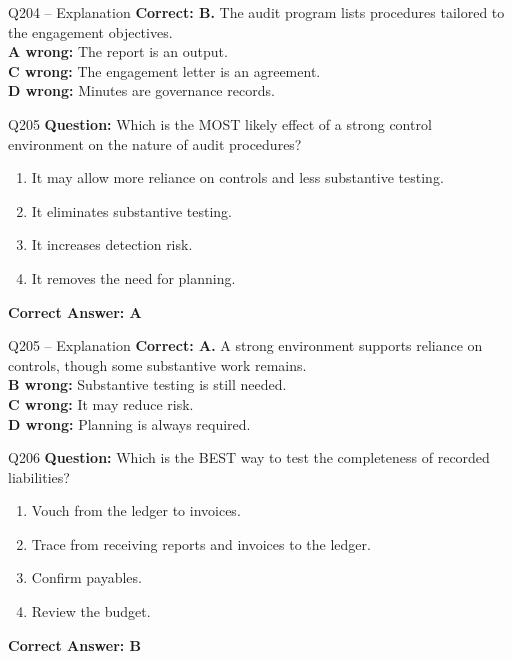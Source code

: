 \documentclass[aspectratio=169,10pt]{beamer}
\begin{document}
	\begin{frame}[t]{Q204 -- Explanation}
		\small
		\textbf{Correct: B.} The audit program lists procedures tailored to the engagement objectives. \\[4pt]
		\textbf{A wrong:} The report is an output. \\[2pt]
		\textbf{C wrong:} The engagement letter is an agreement. \\[2pt]
		\textbf{D wrong:} Minutes are governance records.
	\end{frame}
	
	\begin{frame}[t]{Q205}
		\small
		\textbf{Question:} Which is the MOST likely effect of a strong control environment on the nature of audit procedures?
		\begin{enumerate}[label=\Alph*.,itemsep=1pt,topsep=2pt]
			\item It may allow more reliance on controls and less substantive testing.
			\item It eliminates substantive testing.
			\item It increases detection risk.
			\item It removes the need for planning.
		\end{enumerate}
		\vspace{4pt}
		\textbf{Correct Answer: A}
	\end{frame}
	
	\begin{frame}[t]{Q205 -- Explanation}
		\small
		\textbf{Correct: A.} A strong environment supports reliance on controls, though some substantive work remains. \\[4pt]
		\textbf{B wrong:} Substantive testing is still needed. \\[2pt]
		\textbf{C wrong:} It may reduce risk. \\[2pt]
		\textbf{D wrong:} Planning is always required.
	\end{frame}
	
	\begin{frame}[t]{Q206}
		\small
		\textbf{Question:} Which is the BEST way to test the completeness of recorded liabilities?
		\begin{enumerate}[label=\Alph*.,itemsep=1pt,topsep=2pt]
			\item Vouch from the ledger to invoices.
			\item Trace from receiving reports and invoices to the ledger.
			\item Confirm payables.
			\item Review the budget.
		\end{enumerate}
		\vspace{4pt}
		\textbf{Correct Answer: B}
	\end{frame}
	
\end{document}
